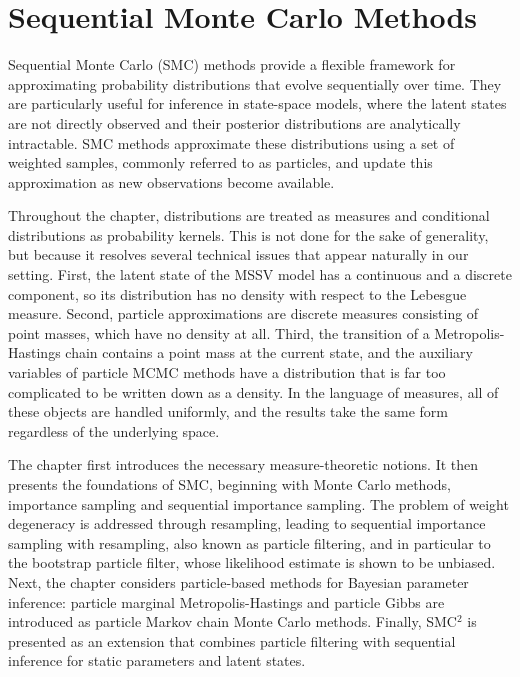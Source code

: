 \chapter{Sequential Monte Carlo Methods}
\label{chap:sequential_monte_carlo}

Sequential Monte Carlo (SMC) methods provide a flexible framework for approximating probability distributions that evolve sequentially over time.
They are particularly useful for inference in state-space models, where the latent states are not directly observed and their posterior distributions are analytically intractable.
SMC methods approximate these distributions using a set of weighted samples, commonly referred to as particles, and update this approximation as new observations become available.

Throughout the chapter, distributions are treated as measures and conditional distributions as probability kernels.
This is not done for the sake of generality, but because it resolves several technical issues that appear naturally in our setting.
First, the latent state of the MSSV model has a continuous and a discrete component, so its distribution has no density with respect to the Lebesgue measure.
Second, particle approximations are discrete measures consisting of point masses, which have no density at all.
Third, the transition of a Metropolis-Hastings chain contains a point mass at the current state, and the auxiliary variables of particle MCMC methods have a distribution that is far too complicated to be written down as a density.
In the language of measures, all of these objects are handled uniformly, and the results take the same form regardless of the underlying space.

The chapter first introduces the necessary measure-theoretic notions.
It then presents the foundations of SMC, beginning with Monte Carlo methods, importance sampling and sequential importance sampling.
The problem of weight degeneracy is addressed through resampling, leading to sequential importance sampling with resampling, also known as particle filtering, and in particular to the bootstrap particle filter, whose likelihood estimate is shown to be unbiased.
Next, the chapter considers particle-based methods for Bayesian parameter inference: particle marginal Metropolis-Hastings and particle Gibbs are introduced as particle Markov chain Monte Carlo methods.
Finally, SMC$^2$ is presented as an extension that combines particle filtering with sequential inference for static parameters and latent states.

